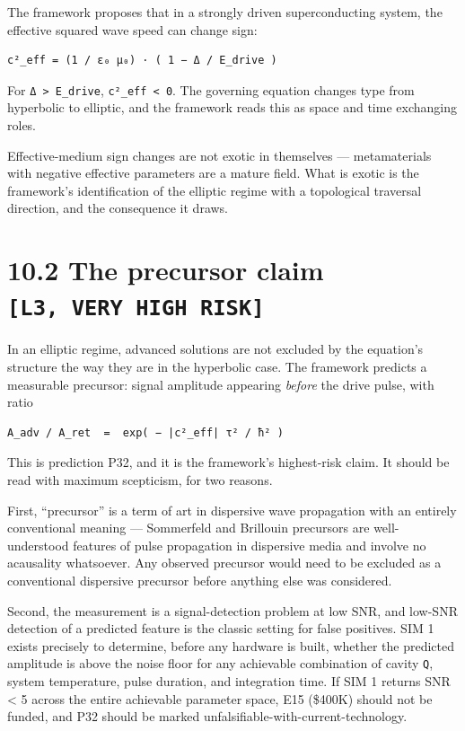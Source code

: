 \documentclass[
  11pt]{report}
\begin{document}
The framework proposes that in a strongly driven superconducting system,
the effective squared wave speed can change sign:

\begin{verbatim}
c²_eff = (1 / ε₀ μ₀) · ( 1 − Δ / E_drive )
\end{verbatim}

For \texttt{Δ\ \textgreater{}\ E\_drive},
\texttt{c²\_eff\ \textless{}\ 0}. The governing equation changes type
from hyperbolic to elliptic, and the framework reads this as space and
time exchanging roles.

Effective-medium sign changes are not exotic in themselves ---
metamaterials with negative effective parameters are a mature field.
What is exotic is the framework's identification of the elliptic regime
with a topological traversal direction, and the consequence it draws.

\hypertarget{the-precursor-claim-l3-very-high-risk}{%
\section{\texorpdfstring{10.2 The precursor claim
\texttt{{[}L3,\ VERY\ HIGH\ RISK{]}}}{10.2 The precursor claim {[}L3, VERY HIGH RISK{]}}}\label{the-precursor-claim-l3-very-high-risk}}

In an elliptic regime, advanced solutions are not excluded by the
equation's structure the way they are in the hyperbolic case. The
framework predicts a measurable precursor: signal amplitude appearing
\emph{before} the drive pulse, with ratio

\begin{verbatim}
A_adv / A_ret  =  exp( − |c²_eff| τ² / ħ² )
\end{verbatim}

This is prediction P32, and it is the framework's highest-risk claim. It
should be read with maximum scepticism, for two reasons.

First, ``precursor'' is a term of art in dispersive wave propagation
with an entirely conventional meaning --- Sommerfeld and Brillouin
precursors are well-understood features of pulse propagation in
dispersive media and involve no acausality whatsoever. Any observed
precursor would need to be excluded as a conventional dispersive
precursor before anything else was considered.

Second, the measurement is a signal-detection problem at low SNR, and
low-SNR detection of a predicted feature is the classic setting for
false positives. SIM 1 exists precisely to determine, before any
hardware is built, whether the predicted amplitude is above the noise
floor for any achievable combination of cavity \texttt{Q}, system
temperature, pulse duration, and integration time. If SIM 1 returns SNR
\textless{} 5 across the entire achievable parameter space, E15 (\$400K)
should not be funded, and P32 should be marked
unfalsifiable-with-current-technology.
\end{document}
